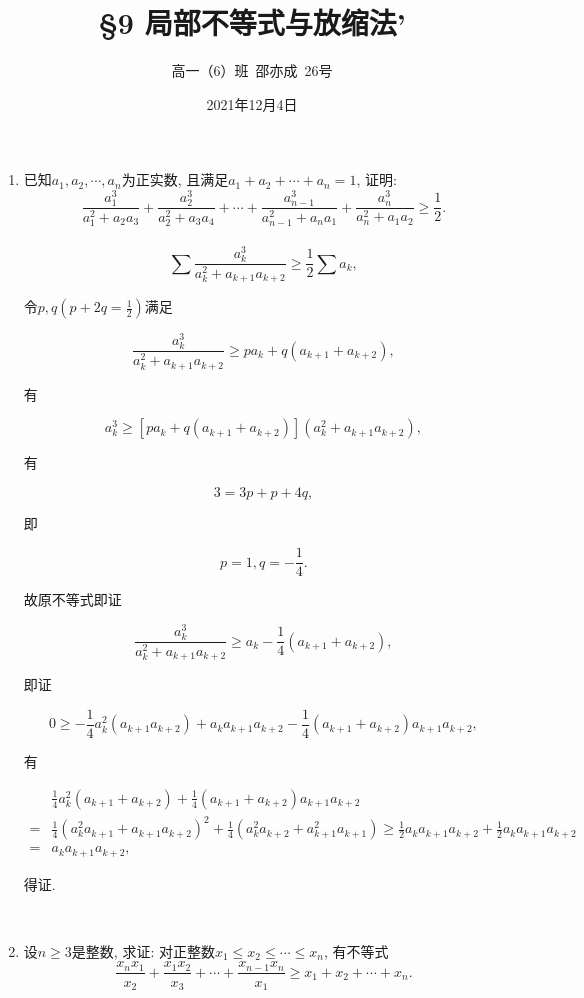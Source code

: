 \documentclass[8pt]{article}
\title{\S 9 局部不等式与放缩法'}
\author{高一（6）班\ 邵亦成\ 26号}
\date{2021年12月4日}
\begin{document}
	\maketitle

	\begin{enumerate}
		\item 已知$a_1, a_2, \cdots, a_n$为正实数, 且满足$a_1 + a_2 + \cdots + a_n = 1$, 证明: $$\frac{a_1^3}{a_1^2+a_2 a_3}+\frac{a_2^3}{a_2^2+a_3 a_4}+\cdots+\frac{a_{n-1}^3}{a_{n-1}^2+a_n a_1}+\frac{a_n^3}{a_n^2+a_1 a_2}\geq\frac{1}{2}.$$
			~\\

			$$\sum \frac{a_k^3}{a_k^2 + a_{k+1} a_{k+2}} \geq \frac{1}{2} \sum a_k,$$

			令$p, q (p+2q=\frac{1}{2})$满足

			$$\frac{a_k^3}{a_k^2+a_{k+1} a_{k+2}} \geq p a_k + q(a_{k+1} + a_{k+2}),$$

			有

			$$a_k^3 \geq \left[pa_k + q(a_{k+1}+a_{k+2})\right] (a_k^2 + a_{k+1} a_{k+2}),$$

			有

			$$3=3p+p+4q,$$

			即

			$$p=1, q=-\frac{1}{4}.$$

			故原不等式即证

			$$\frac{a_k^3}{a_k^2 + a_{k+1} a_{k+2}} \geq a_k - \frac{1}{4} (a_{k+1} + a_{k+2}),$$

			即证

			$$0\geq -\frac{1}{4} a_k^2 (a_{k+1} a_{k+2}) + a_k a_{k+1} a_{k+2} - \frac{1}{4} (a_{k+1} + a_{k+2}) a_{k+1} a_{k+2},$$

			有

			\begin{align*}
			&\frac{1}{4} a_k^2 (a_{k+1} + a_{k+2}) + \frac{1}{4} (a_{k+1} + a_{k+2}) a_{k+1} a_{k+2}\\ =&\frac{1}{4} (a_k^2 a_{k+1} + a_{k+1} a_{k+2})^2 + \frac{1}{4} (a_k^2 a_{k+2} + a_{k+1}^2 a_{k+1}) \geq \frac{1}{2} a_k a_{k+1} a_{k+2} + \frac{1}{2} a_k a_{k+1} a_{k+2}\\ =&
			a_k a_{k+1} a_{k+2},
			\end{align*}

			得证.

		~\\

		\item 设$n\geq 3$是整数, 求证: 对正整数$x_1 \leq x_2 \leq \cdots \leq x_n$, 有不等式$$\frac{x_n x_1}{x_2} + \frac{x_1 x_2}{x_3} + \cdots + \frac{x_{n-1} x_n}{x_1} \geq x_1 + x_2 + \cdots + x_n.$$
			~\\


\end{enumerate}
\end{document}
